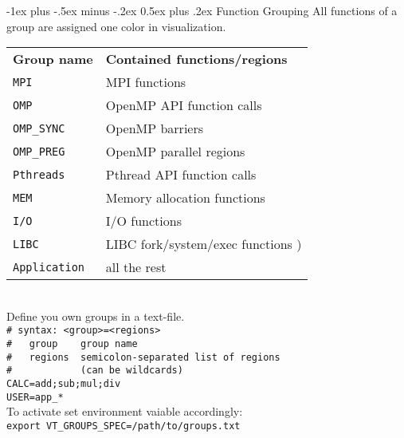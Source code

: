 \documentclass[a4paper,10pt,landscape]{article}
\makeatletter
\renewcommand{\section}{\@startsection{section}{1}{0mm}%
                                {-1ex plus -.5ex minus -.2ex}%
                                {0.5ex plus .2ex}%
                                {\normalfont\large\bfseries}}
\makeatother
\begin{document}
\begin{multicols}{3}
\section{Function Grouping}
All functions of a group are assigned one color in visualization.
\begin{tabular}{@{}ll@{}}
\textbf{Group name} & \textbf{Contained functions/regions}\\
\texttt{MPI}  & MPI functions\\
\texttt{OMP}  & OpenMP API function calls\\
\texttt{OMP\_SYNC} & OpenMP barriers \\
\texttt{OMP\_PREG} & OpenMP parallel regions \\
\texttt{Pthreads} & Pthread API function calls \\
\texttt{MEM}  & Memory allocation functions \\
\texttt{I/O}  & I/O functions \\
\texttt{LIBC} & LIBC fork/system/exec functions )\\
\texttt{Application} & all the rest\\
\end{tabular}\\
Define you own groups in a text-file.\\
\verb!# syntax: <group>=<regions>!\\
\verb!#   group    group name !\\
\verb!#   regions  semicolon-separated list of regions!\\
\verb!#            (can be wildcards)!\\
\verb!CALC=add;sub;mul;div!\\
\verb!USER=app_*!\\
To activate set environment vaiable accordingly:\\
\texttt{export VT\_GROUPS\_SPEC=/path/to/groups.txt}\\





\end{multicols}
\end{document}

